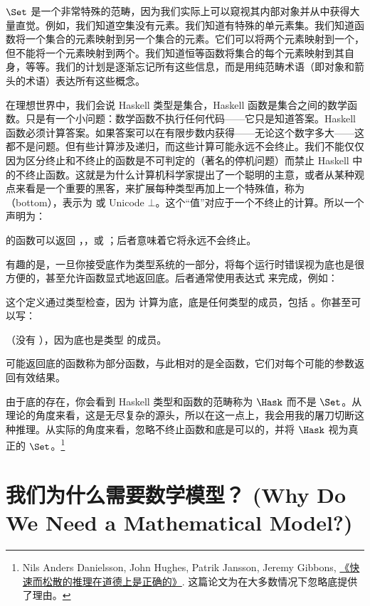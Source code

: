 $\Set$ 是一个非常特殊的范畴，因为我们实际上可以窥视其内部对象并从中获得大量直觉。例如，我们知道空集没有元素。我们知道有特殊的单元素集。我们知道函数将一个集合的元素映射到另一个集合的元素。它们可以将两个元素映射到一个，但不能将一个元素映射到两个。我们知道恒等函数将集合的每个元素映射到其自身，等等。我们的计划是逐渐忘记所有这些信息，而是用纯范畴术语（即对象和箭头的术语）表达所有这些概念。

在理想世界中，我们会说 Haskell 类型是集合，Haskell 函数是集合之间的数学函数。只是有一个小问题：数学函数不执行任何代码——它只是知道答案。Haskell 函数必须计算答案。如果答案可以在有限步数内获得——无论这个数字多大——这都不是问题。但有些计算涉及递归，而这些计算可能永远不会终止。我们不能仅仅因为区分终止和不终止的函数是不可判定的（著名的停机问题）而禁止 Haskell 中的不终止函数。这就是为什么计算机科学家提出了一个聪明的主意，或者从某种观点来看是一个重要的黑客，来扩展每种类型再加上一个特殊值，称为 （bottom），表示为 \code{\_|\_} 或 Unicode $\bot$。这个“值”对应于一个不终止的计算。所以一个声明为：

的函数可以返回 ，，或 \code{\_|\_}；后者意味着它将永远不会终止。

有趣的是，一旦你接受底作为类型系统的一部分，将每个运行时错误视为底也是很方便的，甚至允许函数显式地返回底。后者通常使用表达式  来完成，例如：

这个定义通过类型检查，因为  计算为底，底是任何类型的成员，包括 。你甚至可以写：

（没有 ），因为底也是类型  的成员。

可能返回底的函数称为部分函数，与此相对的是全函数，它们对每个可能的参数返回有效结果。

由于底的存在，你会看到 Haskell 类型和函数的范畴称为 $\Hask$ 而不是 $\Set$。从理论的角度来看，这是无尽复杂的源头，所以在这一点上，我会用我的屠刀切断这种推理。从实际的角度来看，忽略不终止函数和底是可以的，并将 $\Hask$ 视为真正的 $\Set$。\footnote{Nils Anders Danielsson,
  John Hughes, Patrik Jansson, Jeremy Gibbons, \href{http://www.cs.ox.ac.uk/jeremy.gibbons/publications/fast+loose.pdf}{
    《快速而松散的推理在道德上是正确的》}. 这篇论文为在大多数情况下忽略底提供了理由。}

\section{我们为什么需要数学模型？ (Why Do We Need a Mathematical Model?)}

